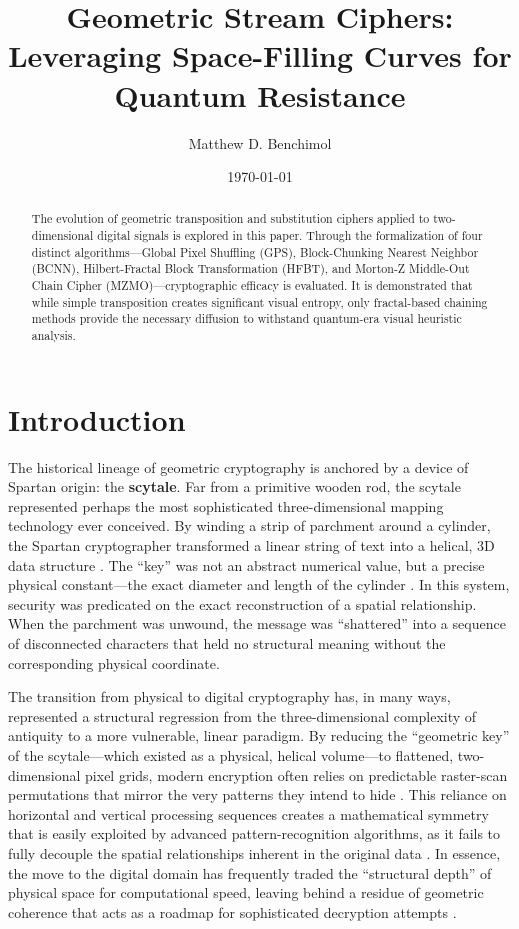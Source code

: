 \documentclass[12pt,fleqn]{article}
\title{\textbf{Geometric Stream Ciphers: Leveraging Space-Filling Curves for Quantum Resistance}}
\author{Matthew D. Benchimol}
\date{\today}
\begin{document}
\maketitle

\begin{abstract}
The evolution of geometric transposition and substitution ciphers applied to two-dimensional digital signals is explored in this paper. Through the formalization of four distinct algorithms—Global Pixel Shuffling (GPS), Block-Chunking Nearest Neighbor (BCNN), Hilbert-Fractal Block Transformation (HFBT), and Morton-Z Middle-Out Chain Cipher (MZMO)—cryptographic efficacy is evaluated. It is demonstrated that while simple transposition creates significant visual entropy, only fractal-based chaining methods provide the necessary diffusion to withstand quantum-era visual heuristic analysis.
\end{abstract}

\section{Introduction}

The historical lineage of geometric cryptography is anchored by a device of Spartan origin: the \textbf{scytale}. Far from a primitive wooden rod, the scytale represented perhaps the most sophisticated three-dimensional mapping technology ever conceived. By winding a strip of parchment around a cylinder, the Spartan cryptographer transformed a linear string of text into a helical, 3D data structure \cite{kelly1998myth}. The ``key'' was not an abstract numerical value, but a precise physical constant---the exact diameter and length of the cylinder \cite{singh2000code}. In this system, security was predicated on the exact reconstruction of a spatial relationship. When the parchment was unwound, the message was ``shattered'' into a sequence of disconnected characters that held no structural meaning without the corresponding physical coordinate.

The transition from physical to digital cryptography has, in many ways, represented a structural regression from the three-dimensional complexity of antiquity to a more vulnerable, linear paradigm. By reducing the ``geometric key'' of the scytale---which existed as a physical, helical volume---to flattened, two-dimensional pixel grids, modern encryption often relies on predictable raster-scan permutations that mirror the very patterns they intend to hide \cite{bourbakis1992image}. This reliance on horizontal and vertical processing sequences creates a mathematical symmetry that is easily exploited by advanced pattern-recognition algorithms, as it fails to fully decouple the spatial relationships inherent in the original data \cite{chen2004symmetric}. In essence, the move to the digital domain has frequently traded the ``structural depth'' of physical space for computational speed, leaving behind a residue of geometric coherence that acts as a roadmap for sophisticated decryption attempts \cite{li2011multimedia}.
\end{document}
